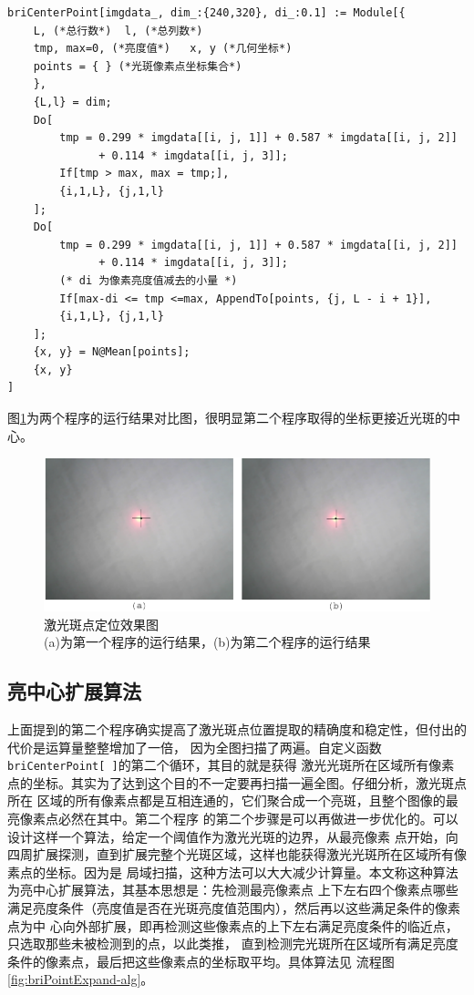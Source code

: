 \documentclass[UTF8,a4paper,12pt]{article}
\begin{document}
\begin{verbatim}
briCenterPoint[imgdata_, dim_:{240,320}, di_:0.1] := Module[{
    L, (*总行数*)  l, (*总列数*)
    tmp, max=0, (*亮度值*)   x, y (*几何坐标*)
    points = { } (*光斑像素点坐标集合*)
    },
    {L,l} = dim;
    Do[
        tmp = 0.299 * imgdata[[i, j, 1]] + 0.587 * imgdata[[i, j, 2]] 
              + 0.114 * imgdata[[i, j, 3]];
        If[tmp > max, max = tmp;],
        {i,1,L}, {j,1,l}
    ];
    Do[
        tmp = 0.299 * imgdata[[i, j, 1]] + 0.587 * imgdata[[i, j, 2]] 
              + 0.114 * imgdata[[i, j, 3]];
        (* di 为像素亮度值减去的小量 *)
        If[max-di <= tmp <=max, AppendTo[points, {j, L - i + 1}],
        {i,1,L}, {j,1,l}
    ];
    {x, y} = N@Mean[points];
    {x, y}
]
\end{verbatim}

图\;\ref{fig:postion}为两个程序的运行结果对比图，很明显第二个程序取得的坐标更接近光斑的中心。

\begin{figure}[htbp]
\centering
\includegraphics[width=135mm]{image/postion.pdf}
\caption{激光斑点定位效果图\\ (a)为第一个程序的运行结果，(b)为第二个程序的运行结果}\label{fig:postion}
\end{figure}

\subsection{亮中心扩展算法}
上面提到的第二个程序确实提高了激光斑点位置提取的精确度和稳定性，但付出的代价是运算量整整增加了一倍，
因为全图扫描了两遍。自定义函数\verb|briCenterPoint[ ]|的第二个循环，其目的就是获得
激光光斑所在区域所有像素点的坐标。其实为了达到这个目的不一定要再扫描一遍全图。仔细分析，激光斑点所在
区域的所有像素点都是互相连通的，它们聚合成一个亮斑，且整个图像的最亮像素点必然在其中。第二个程序
的第二个步骤是可以再做进一步优化的。可以设计这样一个算法，给定一个阈值作为激光光斑的边界，从最亮像素
点开始，向四周扩展探测，直到扩展完整个光斑区域，这样也能获得激光光斑所在区域所有像素点的坐标。因为是
局域扫描，这种方法可以大大减少计算量。本文称这种算法为亮中心扩展算法，其基本思想是：先检测最亮像素点
上下左右四个像素点哪些满足亮度条件（亮度值是否在光斑亮度值范围内），然后再以这些满足条件的像素点为中
心向外部扩展，即再检测这些像素点的上下左右满足亮度条件的临近点，只选取那些未被检测到的点，以此类推，
直到检测完光斑所在区域所有满足亮度条件的像素点，最后把这些像素点的坐标取平均。具体算法见
流程图\;\ref{fig:briPointExpand-alg}。
\end{document}
